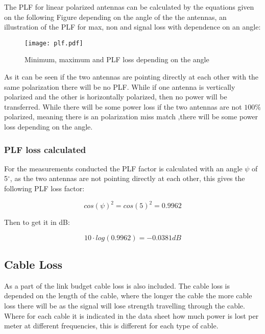 The PLF for linear polarized antennas can be calculated by the equations given on the following Figure depending on the angle of the the antennas, an illustration of the PLF for max, non and signal loss with dependence on an angle:

\begin{figure}[H]
\centering
\texttt{[image: plf.pdf]}
\caption{Minimum, maximum and PLF loss depending on the angle \citep{plf_illu}}
\label{fig:lin_plf}
\end{figure} 

As it can be seen if the two antennas are pointing directly at each other with the same polarization there will be no PLF. While if one antenna is vertically polarized and the other is horizontally polarized, then no power will be transferred. While there will be some power loss if the two antennas are not $100\%$ polarized, meaning there is an polarization miss match ,there will be some power loss depending on the angle.

\subsubsection{PLF loss calculated}

For the measurements conducted the PLF factor is calculated with an angle $\psi$ of 5$^{\circ}$, as the two antennas are not pointing directly at each other, this gives the following PLF loss factor:

\begin{equation}
cos(\psi)^{2} = cos(5)^2 = 0.9962
\end{equation}

Then to get it in dB:

\begin{equation}
10 \cdot log(0.9962) = -0.0381dB
\end{equation}





\subsection{Cable Loss}
As a part of the link budget cable loss is also included. The cable loss is depended on the length of the cable, where the longer the cable the more cable loss there will be as the signal will lose strength travelling through the cable. Where for each cable it is indicated in the data sheet how much power is lost per meter at different frequencies, this is different for each type of cable. 


